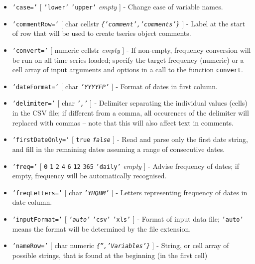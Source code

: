  \begin{itemize}
 \item
   \texttt{'case='} {[} \texttt{'lower'} \textbar{} \texttt{'upper'}
   \textbar{} \emph{empty} {]} - Change case of variable names.
 \item
   \texttt{'commentRow='} {[} char \textbar{} cellstr \textbar{}
   \emph{\texttt{\{'comment','comments'\}}} {]} - Label at the start of
   row that will be used to create tseries object comments.
 \item
   \texttt{'convert='} {[} numeric \textbar{} cellstr \textbar{}
   \emph{empty} {]} - If non-empty, frequency conversion will be run on
   all time series loaded; specify the target frequency (numeric) or a
   cell array of input arguments and options in a call to the function
   \texttt{convert}.
 \item
   \texttt{'dateFormat='} {[} char \textbar{} \emph{\texttt{'YYYYFP'}}
   {]} - Format of dates in first column.
 \item
   \texttt{'delimiter='} {[} char \textbar{} \emph{\texttt{','}} {]} -
   Delimiter separating the individual values (cells) in the CSV file; if
   different from a comma, all occurences of the delimiter will replaced
   with commas -- note that this will also affect text in comments.
 \item
   \texttt{'firstDateOnly='} {[} \texttt{true} \textbar{}
   \emph{\texttt{false}} {]} - Read and parse only the first date string,
   and fill in the remaining dates assuming a range of consecutive dates.
 \item
   \texttt{'freq='} {[} \texttt{0} \textbar{} \texttt{1} \textbar{}
   \texttt{2} \textbar{} \texttt{4} \textbar{} \texttt{6} \textbar{}
   \texttt{12} \textbar{} \texttt{365} \textbar{} \texttt{'daily'}
   \textbar{} \emph{empty} {]} - Advise frequency of dates; if empty,
   frequency will be automatically recognised.
 \item
   \texttt{'freqLetters='} {[} char \textbar{} \emph{\texttt{'YHQBM'}}
   {]} - Letters representing frequency of dates in date column.
 \item
   \texttt{'inputFormat='} {[} \emph{\texttt{'auto'}} \textbar{}
   \texttt{'csv'} \textbar{} \texttt{'xls'} {]} - Format of input data
   file; \texttt{'auto'} means the format will be determined by the file
   extension.
 \item
   \texttt{'nameRow='} {[} char \textbar{} numeric \textbar{}
   \emph{\texttt{\{'','Variables'\}}} {]} - String, or cell array of
   possible strings, that is found at the beginning (in the first cell)

\end{itemize}
